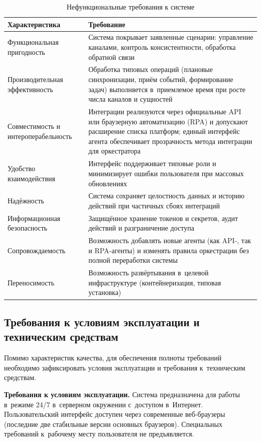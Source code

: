 \begin{table}[H]
  \caption{Нефункциональные требования к системе}
  \label{tab:nfr}
  \small
  \begin{tabularx}{\textwidth}{|p{4.5cm}|X|}
    \hline
    \textbf{Характеристика} & \textbf{Требование} \\
    \hline
    Функциональная пригодность & Система покрывает заявленные сценарии: управление каналами, контроль консистентности, обработка обратной связи \\
    \hline
    Производительная эффективность & Обработка типовых операций (плановые синхронизации, приём событий, формирование задач) выполняется в~приемлемое время при росте числа каналов и сущностей \\
    \hline
    Совместимость и интероперабельность & Интеграции реализуются через официальные API или браузерную автоматизацию (RPA) и допускают расширение списка платформ; единый интерфейс агента обеспечивает прозрачность метода интеграции для оркестратора \\
    \hline
    Удобство взаимодействия & Интерфейс поддерживает типовые роли и минимизирует ошибки пользователя при массовых обновлениях \\
    \hline
    Надёжность & Система сохраняет целостность данных и историю действий при частичных сбоях интеграций \\
    \hline
    Информационная безопасность & Защищённое хранение токенов и секретов, аудит действий и разграничение доступа \\
    \hline
    Сопровождаемость & Возможность добавлять новые агенты (как API-, так и RPA-агенты) и изменять правила оркестрации без полной переработки системы \\
    \hline
    Переносимость & Возможность развёртывания в~целевой инфраструктуре (контейнеризация, типовая установка) \\
    \hline
  \end{tabularx}
\end{table}

\subsection{Требования к условиям эксплуатации и техническим средствам}
\label{subsec:exploitation-req}

Помимо характеристик качества, для обеспечения полноты требований необходимо зафиксировать условия эксплуатации и требования к~техническим средствам.

\textbf{Требования к условиям эксплуатации.} Система предназначена для работы в~режиме 24/7 в~серверном окружении с~доступом в~Интернет. Пользовательский интерфейс доступен через современные веб-браузеры (последние две стабильные версии основных браузеров). Специальных требований к~рабочему месту пользователя не предъявляется.


